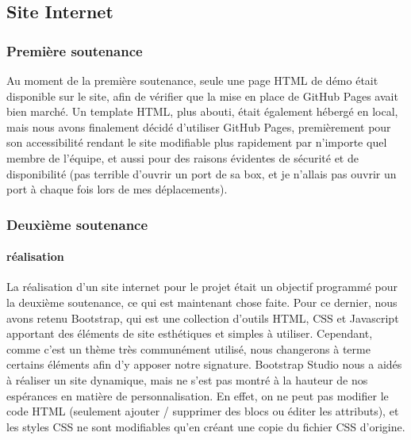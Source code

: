 \subsection{Site Internet}

    \vspace{0.5cm}
    \subsubsection{Première soutenance}
    \vspace{0.5cm}

        Au moment de la première soutenance, seule une page HTML de démo était disponible sur le site, afin de vérifier 
        que la mise en place de GitHub Pages avait bien marché. Un template HTML, plus abouti, était également hébergé en local, 
        mais nous avons finalement décidé d'utiliser GitHub Pages, premièrement pour son accessibilité rendant le site modifiable 
        plus rapidement par n'importe quel membre de l'équipe, et aussi pour des raisons évidentes de sécurité et de disponibilité 
        (pas terrible d'ouvrir un port de sa box, et je n'allais pas ouvrir un port à chaque fois lors de mes déplacements).


    \vspace{0.5cm}
    \subsubsection{Deuxième soutenance}
    \vspace{0.5cm}

        \paragraph{réalisation}

            La réalisation d'un site internet pour le projet était un objectif
            programmé pour la deuxième soutenance, ce qui est maintenant chose faite.
            Pour ce dernier, nous avons retenu Bootstrap, qui est une collection
            d'outils HTML, CSS et Javascript apportant des éléments de site
            esthétiques et simples à utiliser. Cependant, comme c'est un thème très 
            communément utilisé, nous changerons à terme certains éléments afin 
            d'y apposer notre signature. Bootstrap Studio nous a aidés à réaliser
            un site dynamique, mais ne s'est pas montré à la hauteur de nos espérances
            en matière de personnalisation. En effet, on ne peut pas modifier
            le code HTML (seulement ajouter / supprimer des blocs ou éditer les
            attributs), et les styles CSS ne sont modifiables qu'en créant une copie
            du fichier CSS d'origine.


